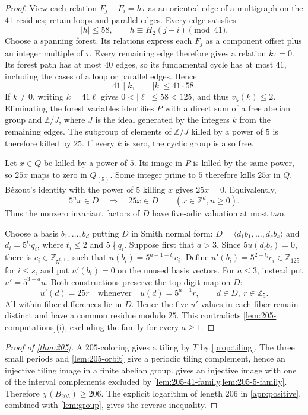 \documentclass[11pt,reqno]{amsart}
\newcommand{\Z}{\mathbb Z}
\theoremstyle{definition}
\theoremstyle{remark}
\numberwithin{equation}{section}
\begin{document}
\begin{proof}
View each relation $F_j-F_i=h\tau$ as an oriented edge of a
multigraph on the $41$ residues; retain loops and parallel edges.
Every edge satisfies
\[
 |h|\le58,\qquad h\equiv H_2(j-i)\pmod{41}.
\]
Choose a spanning forest. Its relations express each $F_j$ as a
component offset plus an integer multiple of $\tau$.
Every remaining edge therefore gives a relation $k\tau=0$.
Its forest path has at most $40$ edges, so its fundamental cycle has
at most $41$, including the cases of a loop or parallel edges. Hence
\[
 41\mid k,\qquad |k|\le41\cdot58.
\]
If $k\ne0$, writing $k=41\ell$ gives $0<|\ell|\le58<125$, and thus
$v_5(k)\le2$. Eliminating the forest variables identifies $P$ with a direct sum
of a free abelian group and $\Z/J$, where $J$ is the ideal generated
by the integers $k$ from the remaining edges. The subgroup of elements
of $\Z/J$ killed by a power of $5$ is therefore killed by $25$.
If every $k$ is zero, the cyclic group is also free.

Let $x\in Q$ be killed by a power of $5$. Its image in $P$ is killed
by the same power, so $25x$ maps to zero in $Q_{(5)}$.
Some integer prime to $5$ therefore kills $25x$ in $Q$.
B\'ezout's identity with the power of $5$ killing $x$ gives $25x=0$.
Equivalently,
\[
 5^n x\in D\quad\Longrightarrow\quad25x\in D
 \qquad(x\in\Z^d, n\ge0).
\]
Thus the nonzero invariant factors of $D$ have five-adic valuation at most two.

Choose a basis $b_1,\ldots,b_d$ putting $D$ in Smith normal form:
$D=\langle d_1b_1,\ldots,d_sb_s\rangle$ and
$d_i=5^{t_i}q_i$, where $t_i\le2$ and $5\nmid q_i$.
Suppose first that $a>3$. Since $5u(d_i b_i)=0$,
there is $c_i\in\Z_{5^{t_i+1}}$ such that
$u(b_i)=5^{a-1-t_i}c_i$. Define
$u'(b_i)=5^{2-t_i}c_i\in\Z_{125}$ for $i\le s$,
and put $u'(b_i)=0$ on the unused basis vectors.
For $a\le3$, instead put $u'=5^{3-a}u$.
Both constructions preserve the top-digit map on $D$:
\[
 u'(d)=25r\quad\text{whenever}\quad
 u(d)=5^{a-1}r,\qquad d\in D,\ r\in\Z_5.
\]
All within-fiber differences lie in $D$. Hence the five $u'$-values
in each fiber remain distinct and have a common residue modulo $25$.
This contradicts \cref{lem:205-computations}(i), excluding the family
for every $a\ge1$.
\end{proof}

\begin{proof}[Proof of \cref{thm:205}]
A $205$-coloring gives a tiling by $T$ by \cref{prop:tiling}.
The three small periods and \cref{lem:205-orbit} give a periodic
tiling complement, hence an injective tiling image in a finite abelian group.
 gives an injective image with one of the
interval complements excluded by \cref{lem:205-41-family,lem:205-5-family}.
Therefore
$\chi(B_{205})\ge206$. The explicit logarithm of length $206$ in
\cref{app:positive}, combined with \cref{lem:group}, gives the reverse inequality.
\end{proof}
\end{document}

